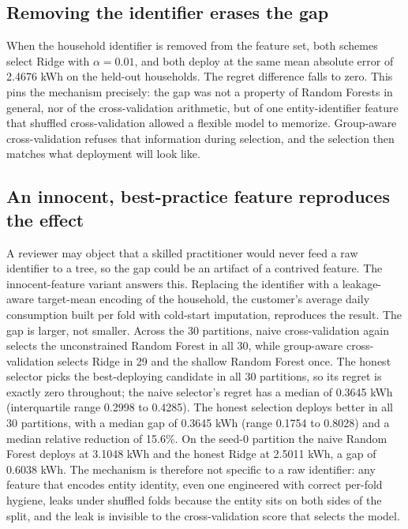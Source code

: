 \documentclass[forecasting,article,submit,oneauthor,pdftex]{Definitions/mdpi}
\DeclareRobustCommand{\code}[1]{\texttt{\detokenize{#1}}}
\begin{document}
\subsection{Removing the identifier erases the gap}

When the household identifier \code{hh_int} is removed from the feature set, both
schemes select Ridge with $\alpha = 0.01$, and both deploy at the same mean
absolute error of 2.4676 kWh on the held-out households. The regret difference
falls to zero. This pins the mechanism precisely: the gap was not a property of
Random Forests in general, nor of the cross-validation arithmetic, but of one
entity-identifier feature that shuffled cross-validation allowed a flexible model
to memorize. Group-aware cross-validation refuses that information during
selection, and the selection then matches what deployment will look like.

\subsection{An innocent, best-practice feature reproduces the effect}

A reviewer may object that a skilled practitioner would never feed a raw
identifier to a tree, so the gap could be an artifact of a contrived feature. The
innocent-feature variant answers this. Replacing the identifier with a
leakage-aware target-mean encoding of the household, the customer's average daily
consumption built per fold with cold-start imputation, reproduces the result. The
gap is larger, not smaller. Across the 30 partitions, naive cross-validation again
selects the unconstrained Random Forest in all 30, while group-aware
cross-validation selects Ridge in 29 and the shallow Random Forest once. The
honest selector picks the best-deploying candidate in all 30 partitions, so its
regret is exactly zero throughout; the naive selector's regret has a median of
0.3645 kWh (interquartile range 0.2998 to 0.4285). The honest selection deploys better
in all 30 partitions, with a median gap of 0.3645 kWh (range 0.1754 to 0.8028)
and a median relative reduction of 15.6\%. On the seed-0 partition the naive
Random Forest deploys at 3.1048 kWh and the honest Ridge at 2.5011 kWh, a gap of
0.6038 kWh. The mechanism is therefore not specific to a raw identifier: any
feature that encodes entity identity, even one engineered with correct per-fold
hygiene, leaks under shuffled folds because the entity sits on both sides of the
split, and the leak is invisible to the cross-validation score that selects the
model.
\end{document}
